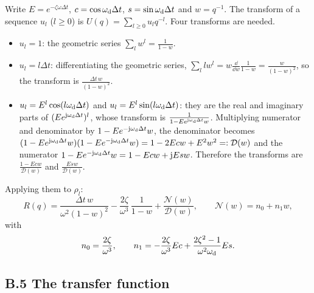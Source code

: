Write $E = e^{-\zeta\omega\Delta t}$, $c = \cos\omega_{\mathrm{d}}\Delta t$, $s = \sin\omega_{\mathrm{d}}\Delta t$ and $w = q^{-1}$.
The transform of a sequence $u_l$ ($l\ge0$) is $U(q) = \sum_{l\ge0}u_lq^{-l}$. Four transforms are
needed.
\begin{itemize}[nosep]
\item $u_l = 1$: the geometric series $\sum_lw^l = \frac{1}{1-w}$.
\item $u_l = l\Delta t$: differentiating the geometric series, $\sum_l lw^l = w\frac{\dd}{\dd w}\frac{1}{1-w} =
\frac{w}{(1-w)^2}$, so the transform is $\frac{\Delta t\,w}{(1-w)^2}$.
\item $u_l = E^l\cos(l\omega_{\mathrm{d}}\Delta t)$ and $u_l = E^l\sin(l\omega_{\mathrm{d}}\Delta t)$: they are the real and imaginary
parts of $(Ee^{\mathrm{j}\omega_{\mathrm{d}}\Delta t})^l$, whose transform is $\frac{1}{1-Ee^{\mathrm{j}\omega_{\mathrm{d}}\Delta t}w}$. Multiplying
numerator and denominator by $1-Ee^{-\mathrm{j}\omega_{\mathrm{d}}\Delta t}w$, the denominator becomes
$(1-Ee^{\mathrm{j}\omega_{\mathrm{d}}\Delta t}w)(1-Ee^{-\mathrm{j}\omega_{\mathrm{d}}\Delta t}w) = 1-2Ecw+E^2w^2 =: \mathcal D(w)$ and the
numerator $1-Ee^{-\mathrm{j}\omega_{\mathrm{d}}\Delta t}w = 1 - Ecw + \mathrm{j} Esw$. Therefore the transforms are
$\frac{1-Ecw}{\mathcal D(w)}$ and $\frac{Esw}{\mathcal D(w)}$.
\end{itemize}
Applying them to $\rho_l$:
\begin{equation}
  R(q) = \frac{\Delta t\,w}{\omega^2(1-w)^2} - \frac{2\zeta}{\omega^3}\,\frac{1}{1-w} + \frac{\mathcal N(w)}{\mathcal D(w)},
  \qquad \mathcal N(w) = n_0 + n_1w,
\end{equation}
with
\begin{equation}
  n_0 = \frac{2\zeta}{\omega^3},\qquad n_1 = -\frac{2\zeta}{\omega^3}Ec + \frac{2\zeta^2-1}{\omega^2\omega_{\mathrm{d}}}Es .
\end{equation}

\subsection*{B.5 The transfer function}

